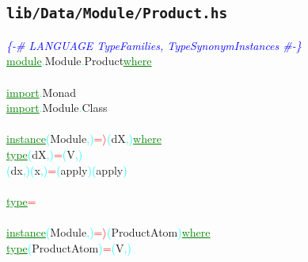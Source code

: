 \subsection{\texttt{lib/Data/Module/Product.hs}}
\label{mod:Data.Module.Product}
\textcolor{blue}{{\it{}\{-\# LANGUAGE TypeFamilies, TypeSynonymInstances \#-\}}}\\\textcolor{green}{\underline{module}}\textcolor{cyan}{.}{\rm{}Module}\textcolor{cyan}{.}{\rm{}Product}\hsspace \textcolor{green}{\underline{where}}\\\\\textcolor{green}{\underline{import}}\textcolor{cyan}{.}{\rm{}Monad}\\\textcolor{green}{\underline{import}}\textcolor{cyan}{.}{\rm{}Module}\textcolor{cyan}{.}{\rm{}Class}\\\\\textcolor{green}{\underline{instance}}\hsspace \textcolor{cyan}{(}{\rm{}Module}\textcolor{cyan}{,}\textcolor{cyan}{)}\hsspace \textcolor{red}{=\ensuremath{\rangle}}\hsspace \textcolor{cyan}{(}{\rm{}dX}\textcolor{cyan}{,}\textcolor{cyan}{)}\hsspace \textcolor{green}{\underline{where}}\\\hstab \textcolor{green}{\underline{type}}\hsspace \textcolor{cyan}{(}{\rm{}dX}\textcolor{cyan}{,}\textcolor{cyan}{)}\hsspace \textcolor{red}{=}\hsspace \textcolor{cyan}{(}{\rm{}V}\textcolor{cyan}{,}\textcolor{cyan}{)}\\\hsspace \textcolor{cyan}{(}{\rm{}dx}\textcolor{cyan}{,}\textcolor{cyan}{)}\hsspace \textcolor{cyan}{(}{\rm{}x}\textcolor{cyan}{,}\textcolor{cyan}{)}\hsspace \textcolor{red}{=}\hsspace {\rm{}(,)}\hsspace \textcolor{cyan}{(}{\rm{}apply}\textcolor{cyan}{)}\hsspace \textcolor{cyan}{(}{\rm{}apply}\textcolor{cyan}{)}\\\\\textcolor{green}{\underline{type}}\hsspace \textcolor{red}{=}\\\\\textcolor{green}{\underline{instance}}\hsspace \textcolor{cyan}{(}{\rm{}Module}\textcolor{cyan}{,}\textcolor{cyan}{)}\hsspace \textcolor{red}{=\ensuremath{\rangle}}\hsspace \textcolor{cyan}{(}{\rm{}ProductAtom}\textcolor{cyan}{)}\hsspace \textcolor{green}{\underline{where}}\\\hstab \textcolor{green}{\underline{type}}\hsspace \textcolor{cyan}{(}{\rm{}ProductAtom}\textcolor{cyan}{)}\hsspace \textcolor{red}{=}\hsspace \textcolor{cyan}{(}{\rm{}V}\textcolor{cyan}{,}\textcolor{cyan}{)}\\\hsspace 